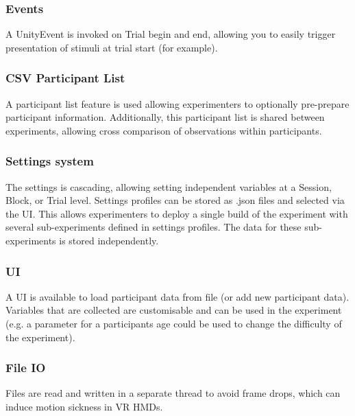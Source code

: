 \subsubsection*{Events}

A {\ttfamily Unity\+Event} is invoked on {\ttfamily Trial} begin and end, allowing you to easily trigger presentation of stimuli at trial start (for example).

\subsubsection*{C\+SV Participant List}

A participant list feature is used allowing experimenters to optionally pre-\/prepare participant information. Additionally, this participant list is shared between experiments, allowing cross comparison of observations within participants. ~\newline
 \subsubsection*{Settings system}

The settings is cascading, allowing setting independent variables at a {\ttfamily Session}, {\ttfamily Block}, or {\ttfamily Trial} level. Settings profiles can be stored as {\ttfamily .json} files and selected via the UI. This allows experimenters to deploy a single build of the experiment with several sub-\/experiments defined in settings profiles. The data for these sub-\/experiments is stored independently. ~\newline
 \subsubsection*{UI}

A UI is available to load participant data from file (or add new participant data). Variables that are collected are customisable and can be used in the experiment (e.\+g. a parameter for a participant\textquotesingle{}s age could be used to change the difficulty of the experiment).



\subsubsection*{File IO}

Files are read and written in a separate thread to avoid frame drops, which can induce motion sickness in VR H\+M\+Ds.

